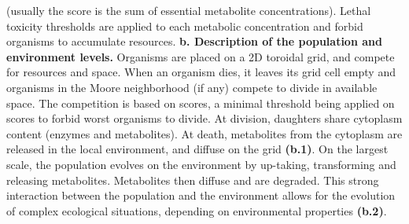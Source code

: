 \begin{figurehere}
{{(usually the score is the sum of essential metabolite concentrations). Lethal toxicity thresholds are applied to each metabolic concentration and forbid organisms to accumulate resources. \textbf{b. Description of the population and environment levels.} Organisms are placed on a 2D toroidal grid, and compete for resources and space. When an organism dies, it leaves its grid cell empty and organisms in the Moore neighborhood (if any) compete to divide in available space. The competition is based on scores, a minimal threshold being applied on scores to forbid worst organisms to divide. At division, daughters share cytoplasm content (enzymes and metabolites). At death, metabolites from the cytoplasm are released in the local environment, and diffuse on the grid \textbf{(b.1)}. On the largest scale, the population evolves on the environment by up-taking, transforming and releasing metabolites. Metabolites then diffuse and are degraded. This strong interaction between the population and the environment allows for the evolution of complex ecological situations, depending on environmental properties \textbf{(b.2)}.}}
\label{general_algorithm}
\end{figurehere}


